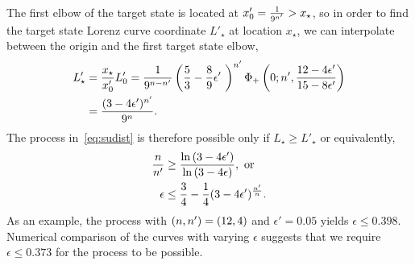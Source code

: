 \documentclass[pra,
aps,
twocolumn,
superscriptaddress,
groupedaddress,
nofootinbib,
reprint
]{revtex4-1}
\begin{document}
The first elbow of the target state is located at $x'_0 = \frac{1}{9^{\tt}} > x_\star$, so in order to find the target state Lorenz curve coordinate $L'_\star$ at location $x_\star$, we can interpolate between the origin and the first target state elbow, 
\begin{equation}\label{eq:constraint_deriv}
	\begin{split}
	L'_\star &= \frac{x_\star}{x'_0}L'_0 = \frac{1}{9^{n-\tt}}\left( \frac{5}{3} - \frac{8}{9}\epsilon'\ \right)^{\tt}\Phi_+\left(0;\tt,\frac{12-4\epsilon'}{15-8\epsilon'}\right) \\
	&= \frac{(3-4\epsilon')^{\tt}}{9^{n}}.
	\end{split}
\end{equation}
The process in~\cref{eq:sudist} is therefore possible only if $L_\star \geq L'_\star$ or equivalently,
\begin{align}
	\frac{n}{n'} &\geq \frac{\ln{(3-4\epsilon')}}{\ln{(3-4\epsilon)}}, \text{ or}\\
	\epsilon &\leq \frac{3}{4} - \frac{1}{4}(3-4\epsilon')^{\frac{\tt}{n}}.
\end{align}
As an example, the process with $(n, \tt) = (12, 4)$ and $\epsilon' = 0.05$ yields $\epsilon \leq 0.398$.
Numerical comparison of the curves with varying $\epsilon$ suggests that we require $\epsilon \leq 0.373$ for the process to be possible.
\end{document}
